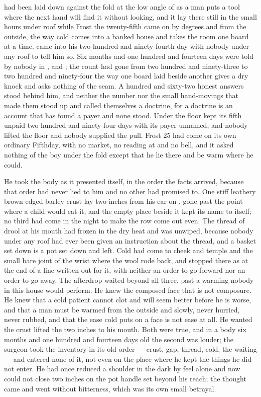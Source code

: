 
 had been laid down against the fold at the low angle of  as a man puts a tool where the next hand will find it without looking, and it lay there still in the small hours under  roof while Frost the twenty-fifth came on by degrees and from the outside, the way cold comes into a banked house and takes the room one board at a time.  came into his two hundred and ninety-fourth day with nobody under any roof to tell him so. Six months and one hundred and fourteen days were told by nobody in ,  and ; the count had gone from two hundred and ninety-three to two hundred and ninety-four the way one board laid beside another gives a dry knock and asks nothing of the seam. A hundred and sixty-two honest answers stood behind him, and neither the number nor the small hand-movings that made them stood up and called themselves a doctrine, for a doctrine is an account that has found a payer and none stood. Under the floor  kept its fifth unpaid two hundred and ninety-four days with its payer unnamed, and nobody lifted the floor and nobody supplied the pull. Frost 25 had come on its own ordinary Fifthday, with no market, no reading at  and no bell, and it asked nothing of the boy under the fold except that he lie there and be warm where he could.

He took the body as it presented itself, in the order the facts arrived, because that order had never lied to him and no other had promised to. One stiff leathery brown-edged barley crust lay two inches from his ear on , gone past the point where a child would eat it, and the empty place beside it kept its name to itself; no third had come in the night to make the row come out even. The thread of drool at his mouth had frozen in the dry heat and was unwiped, because nobody under any roof had ever been given an instruction about the thread, and a basket set down is a pot set down and left. Cold had come to cheek and temple and the small bare joint of the wrist where the wool rode back, and stopped there as at the end of a line written out for it, with neither an order to go forward nor an order to go away. The afterdrop waited beyond all three, past a warming nobody in this house would perform. He knew the composed face that is not composure. He knew that a cold patient cannot clot and will seem better before he is worse, and that a man must be warmed from the outside and slowly, never hurried, never rubbed, and that the ease cold puts on a face is not ease at all. He wanted the crust lifted the two inches to his mouth. Both were true, and in a body six months and one hundred and fourteen days old the second was louder; the surgeon took the inventory in its old order --- crust, gap, thread, cold, the waiting --- and entered none of it, not even on the place where he kept the things he did not enter. He had once reduced a shoulder in the dark by feel alone and now could not close two inches on the pot handle set beyond his reach; the thought came and went without bitterness, which was its own small betrayal.

